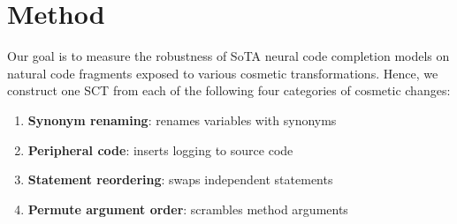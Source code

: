\documentclass[usenames,dvipsnames]{article} %
\begin{document}



  \section{Method}\label{sec:method}

  Our goal is to measure the robustness of SoTA neural code completion models on natural code fragments exposed to various cosmetic transformations. Hence, we construct one SCT from each of the following four categories of cosmetic changes:

  \begin{enumerate}[itemsep=1ex]
    \item \textbf{Synonym renaming}: renames variables with synonyms
    \item \textbf{Peripheral code}: inserts logging to source code
    \item \textbf{Statement reordering}: swaps independent statements
    \item \textbf{Permute argument order}: scrambles method arguments
  \end{enumerate}
\end{document}
